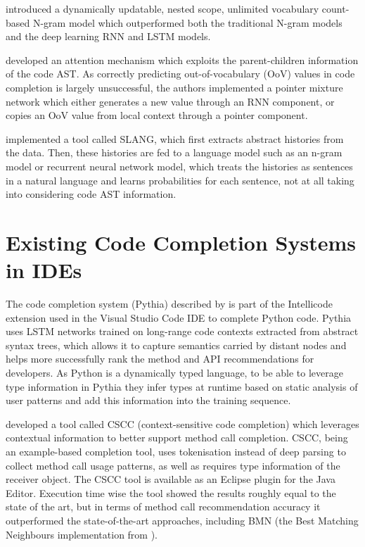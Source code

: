 \cite{Hell17a} introduced a dynamically updatable, nested scope, unlimited vocabulary count-based N-gram model which outperformed both the traditional N-gram models and the deep learning RNN and LSTM models.

\cite{Li17a} developed an attention mechanism which exploits the parent-children information of the code AST. As correctly predicting out-of-vocabulary (OoV) values in code completion is largely unsuccessful, the authors implemented a pointer mixture network which either generates a new value through an RNN component, or copies an OoV value from local context through a pointer component.

\cite{Rayc14a} implemented a tool called SLANG, which ﬁrst extracts abstract histories from the data. Then, these histories are fed to a language model such as an n-gram model or recurrent neural network model, which treats the histories as sentences in a natural language and learns probabilities for each sentence, not at all taking into considering code AST information.

\section{Existing Code Completion Systems in IDEs}
\label{sec:RelatedWorks-ExistingSystems}
The code completion system (Pythia) described by \cite{Svya19a} is part of the Intellicode extension used in the Visual Studio Code IDE to complete Python code. Pythia uses LSTM networks trained on long-range code contexts extracted from abstract syntax trees, which allows it to capture semantics carried by distant nodes and helps more successfully rank the method and API recommendations for developers. As Python is a dynamically typed language, to be able to leverage type information in Pythia they infer types at runtime based on static analysis of user patterns and add this information into the training sequence.

\cite{Asad14a} developed a tool called CSCC (context-sensitive code completion) which leverages contextual information to better support method call completion. CSCC, being an example-based completion tool, uses tokenisation instead of deep parsing to collect method call usage patterns, as well as requires type information of the receiver object. The CSCC tool is available as an Eclipse plugin for the Java Editor. Execution time wise the tool showed the results roughly equal to the state of the art, but in terms of method call recommendation accuracy it outperformed the state-of-the-art approaches, including BMN (the Best Matching Neighbours implementation from \cite{Bruc09a}).